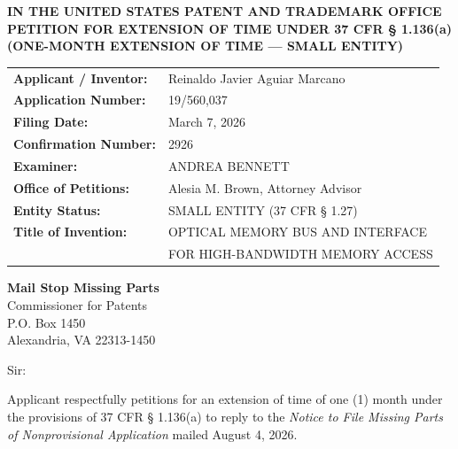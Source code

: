 \documentclass[11pt,letterpaper]{article}
\begin{document}
\thispagestyle{empty}

\begin{center}
    \textbf{\large IN THE UNITED STATES PATENT AND TRADEMARK OFFICE} \\
    \vspace{0.3cm}
    \textbf{\large PETITION FOR EXTENSION OF TIME UNDER 37 CFR \S{} 1.136(a)} \\
    \textbf{\normalsize (ONE-MONTH EXTENSION OF TIME --- SMALL ENTITY)}
\end{center}

\vspace{0.4cm}
\noindent\begin{tabular}{p{2.3in}p{4.0in}}
\textbf{Applicant / Inventor:} & Reinaldo Javier Aguiar Marcano \\
\textbf{Application Number:} & 19/560,037 \\
\textbf{Filing Date:} & March 7, 2026 \\
\textbf{Confirmation Number:} & 2926 \\
\textbf{Examiner:} & ANDREA BENNETT \\
\textbf{Office of Petitions:} & Alesia M. Brown, Attorney Advisor \\
\textbf{Entity Status:} & SMALL ENTITY (37 CFR \S{} 1.27) \\
\textbf{Title of Invention:} & OPTICAL MEMORY BUS AND INTERFACE \\
& FOR HIGH-BANDWIDTH MEMORY ACCESS \\
\end{tabular}

\vspace{0.5cm}
\noindent\textbf{Mail Stop Missing Parts} \\
Commissioner for Patents \\
P.O. Box 1450 \\
Alexandria, VA 22313-1450

\vspace{0.2cm}
Sir:

Applicant respectfully petitions for an extension of time of one (1) month under the provisions of 37 CFR \S{} 1.136(a) to reply to the \textit{Notice to File Missing Parts of Nonprovisional Application} mailed August 4, 2026.
\end{document}
